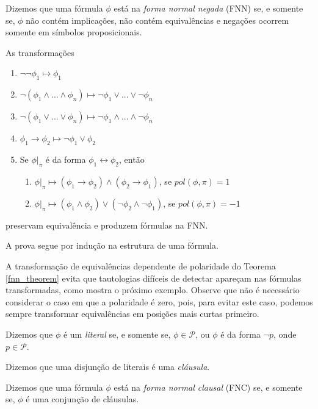 \begin{definition}
    Dizemos que uma fórmula $\phi$ está na \emph{forma normal negada} (FNN) se, e somente se, $\phi$ não contém implicações, não contém equivalências e negações ocorrem somente em símbolos proposicionais.
\end{definition}

\begin{theorem}
    \label{fnn_theorem}
    As transformações
    \begin{enumerate}
        \item $\neg \neg \phi_1 \longmapsto \phi_1$
        \item $\neg(\phi_1 \wedge ... \wedge \phi_n) \longmapsto \neg \phi_1 \vee ... \vee \neg \phi_n$
        \item $\neg(\phi_1 \vee ... \vee \phi_n) \longmapsto \neg \phi_1 \wedge ... \wedge \neg \phi_n$
        \item $\phi_1 \rightarrow \phi_2 \longmapsto \neg \phi_1 \vee \phi_2$
        \item Se $\phi|_\pi$ é da forma $\phi_1 \leftrightarrow \phi_2$, então
        \begin{enumerate}
        	\item $\phi|_\pi \longmapsto (\phi_1 \rightarrow \phi_2) \wedge (\phi_2 \rightarrow \phi_1)$, se $pol(\phi,\pi) = 1$
        	\item $\phi|_\pi \longmapsto (\phi_1 \wedge \phi_2) \vee (\neg \phi_2 \wedge \neg \phi_1)$, se $pol(\phi,\pi) = -1$
        \end{enumerate}
    \end{enumerate}
    preservam equivalência e produzem fórmulas na FNN.
\end{theorem}

A prova segue por indução na estrutura de uma fórmula.

A transformação de equivalências dependente de polaridade do Teorema \ref{fnn_theorem} evita que tautologias difíceis de detectar apareçam nas fórmulas transformadas, como mostra o próximo exemplo. Observe que não é necessário considerar o caso em que a polaridade é zero, pois, para evitar este caso, podemos sempre transformar equivalências em posições mais curtas primeiro.

\begin{definition}
	Dizemos que $\phi$ é um \emph{literal} se, e somente se, $\phi \in \mathcal{P}$, ou $\phi$ é da forma $\neg p$, onde $p \in \mathcal{P}$.
	
	Dizemos que uma disjunção de literais é uma \emph{cláusula}.
	
    Dizemos que uma fórmula $\phi$ está na \emph{forma normal clausal} (FNC) se, e somente se, $\phi$ é uma conjunção de cláusulas.
\end{definition}

